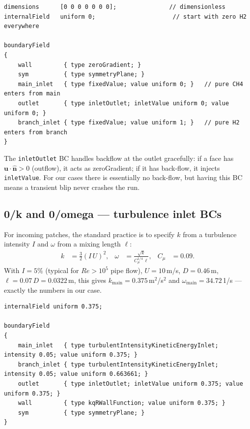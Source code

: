 \documentclass[11pt,a4paper]{article}
\begin{document}
\begin{lstlisting}[style=foamstyle,caption={\texttt{0/H2} (full)}]
dimensions      [0 0 0 0 0 0 0];               // dimensionless
internalField   uniform 0;                      // start with zero H2 everywhere

boundaryField
{
    wall         { type zeroGradient; }
    sym          { type symmetryPlane; }
    main_inlet   { type fixedValue; value uniform 0; }   // pure CH4 enters from main
    outlet       { type inletOutlet; inletValue uniform 0; value uniform 0; }
    branch_inlet { type fixedValue; value uniform 1; }   // pure H2 enters from branch
}
\end{lstlisting}

The \texttt{inletOutlet} BC handles backflow at the outlet
gracefully: if a face has $\mathbf{u}\!\cdot\!\hat{\mathbf{n}}>0$
(outflow), it acts as zeroGradient; if it has back-flow, it injects
\texttt{inletValue}. For our cases there is essentially no back-flow,
but having this BC means a transient blip never crashes the run.

\subsection{0/k and 0/omega --- turbulence inlet BCs}

For incoming patches, the standard practice is to specify $k$ from a
turbulence intensity $I$ and $\omega$ from a mixing length $\ell$:
\begin{align}
k &= \tfrac{3}{2}(I\,U)^2, & \omega &= \frac{\sqrt{k}}{C_\mu^{1/4}\,\ell}, & C_\mu &= 0.09.
\end{align}
With $I = 5\%$ (typical for $Re>10^5$ pipe flow), $U=10$\,m/s,
$D=0.46$\,m, $\ell = 0.07\,D = 0.0322$\,m, this gives
$k_\text{main}=0.375$\,m$^2$/s$^2$ and
$\omega_\text{main}=34.72$\,1/s --- exactly the numbers in our case.

\begin{lstlisting}[style=foamstyle,caption={\texttt{0/k} (full)}]
internalField uniform 0.375;

boundaryField
{
    main_inlet   { type turbulentIntensityKineticEnergyInlet; intensity 0.05; value uniform 0.375; }
    branch_inlet { type turbulentIntensityKineticEnergyInlet; intensity 0.05; value uniform 0.663661; }
    outlet       { type inletOutlet; inletValue uniform 0.375; value uniform 0.375; }
    wall         { type kqRWallFunction; value uniform 0.375; }
    sym          { type symmetryPlane; }
}
\end{lstlisting}
\end{document}
